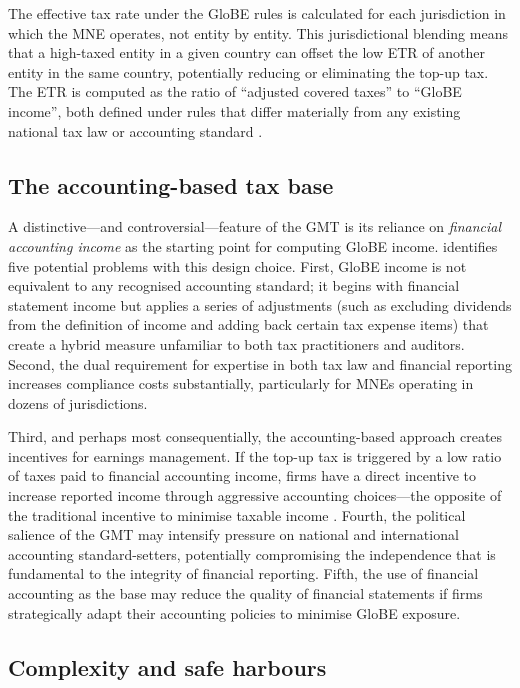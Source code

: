 \documentclass[12pt,a4paper]{article}
\begin{document}
The effective tax rate under the GloBE rules is calculated for each jurisdiction in which the MNE operates, not entity by entity.
This jurisdictional blending means that a high-taxed entity in a given country can offset the low ETR of another entity in the same country, potentially reducing or eliminating the top-up tax.
The ETR is computed as the ratio of ``adjusted covered taxes'' to ``GloBE income'', both defined under rules that differ materially from any existing national tax law or accounting standard \parencite{schanz2023}.

\subsection{The accounting-based tax base}

A distinctive---and controversial---feature of the GMT is its reliance on \emph{financial accounting income} as the starting point for computing GloBE income.
\textcite{hanlon2023} identifies five potential problems with this design choice.
First, GloBE income is not equivalent to any recognised accounting standard; it begins with financial statement income but applies a series of adjustments (such as excluding dividends from the definition of income and adding back certain tax expense items) that create a hybrid measure unfamiliar to both tax practitioners and auditors.
Second, the dual requirement for expertise in both tax law and financial reporting increases compliance costs substantially, particularly for MNEs operating in dozens of jurisdictions.

Third, and perhaps most consequentially, the accounting-based approach creates incentives for earnings management.
If the top-up tax is triggered by a low ratio of taxes paid to financial accounting income, firms have a direct incentive to increase reported income through aggressive accounting choices---the opposite of the traditional incentive to minimise taxable income \parencite{hanlon2023}.
Fourth, the political salience of the GMT may intensify pressure on national and international accounting standard-setters, potentially compromising the independence that is fundamental to the integrity of financial reporting.
Fifth, the use of financial accounting as the base may reduce the quality of financial statements if firms strategically adapt their accounting policies to minimise GloBE exposure.

\subsection{Complexity and safe harbours}
\end{document}
